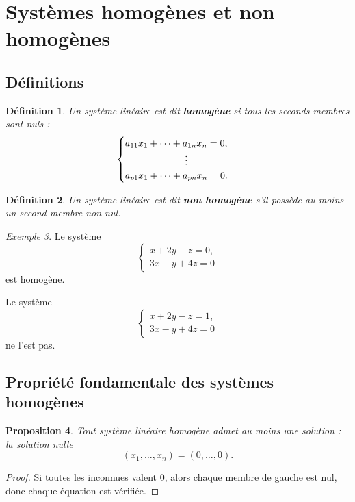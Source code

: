 \documentclass[11pt,a4paper]{article}
\newtheorem{definition}{Définition}[section]
\newtheorem{proposition}[definition]{Proposition}
\theoremstyle{remark}
\newtheorem{exemple}[definition]{Exemple}
\begin{document}
\section{Systèmes homogènes et non homogènes}

\subsection{Définitions}

\begin{definition}
Un système linéaire est dit \textbf{homogène} si tous les seconds membres sont nuls :
\[
\begin{cases}
a_{11}x_1+\cdots+a_{1n}x_n=0,\\
\hspace{2.2cm}\vdots\\
a_{p1}x_1+\cdots+a_{pn}x_n=0.
\end{cases}
\]
\end{definition}

\begin{definition}
Un système linéaire est dit \textbf{non homogène} s’il possède au moins un second membre non nul.
\end{definition}

\begin{exemple}
Le système
\[
\begin{cases}
x+2y-z=0,\\
3x-y+4z=0
\end{cases}
\]
est homogène.

Le système
\[
\begin{cases}
x+2y-z=1,\\
3x-y+4z=0
\end{cases}
\]
ne l’est pas.
\end{exemple}

\subsection{Propriété fondamentale des systèmes homogènes}

\begin{proposition}
Tout système linéaire homogène admet au moins une solution : la solution nulle
\[
(x_1,\dots,x_n)=(0,\dots,0).
\]
\end{proposition}

\begin{proof}
Si toutes les inconnues valent \(0\), alors chaque membre de gauche est nul, donc chaque équation est vérifiée.
\end{proof}
\end{document}
